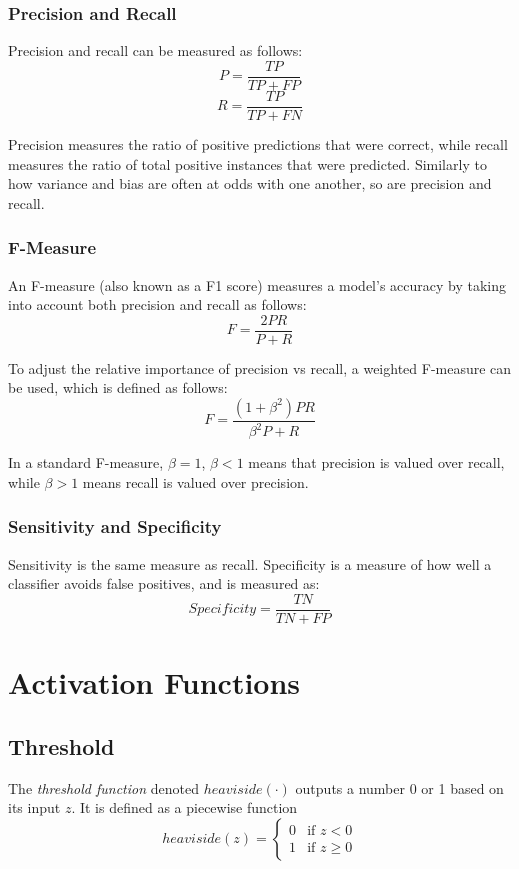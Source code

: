 \documentclass[12pt]{article}
\begin{document}
        \subsubsection{Precision and Recall}
            Precision and recall can be measured as follows:
            $$P = \frac{TP}{TP + FP}$$
            $$R = \frac{TP}{TP + FN}$$
    
            Precision measures the ratio of positive predictions that were correct, while recall measures the ratio of
            total positive instances that were predicted. Similarly to how variance and bias are often at odds with one
            another, so are precision and recall.
    
        \subsubsection{F-Measure}
            An F-measure (also known as a F1 score) measures a model's accuracy by taking into account both precision
            and recall as follows:
            $$F = \frac{2PR}{P + R}$$
    
            To adjust the relative importance of precision vs recall, a weighted F-measure can be used, which is defined
            as follows:
            $$F = \frac{(1 + \beta^2)PR}{\beta^2 P + R}$$
    
            In a standard F-measure, $\beta = 1$, $\beta < 1$ means that precision is valued over recall, while $\beta >
            1$ means recall is valued over precision.
    
        \subsubsection{Sensitivity and Specificity}
            Sensitivity is the same measure as recall. Specificity is a measure of how well a classifier avoids false
            positives, and is measured as:
            $$Specificity = \frac{TN}{TN + FP}$$

\section{Activation Functions} \label{sec:ActivationFunction}
    \subsection{Threshold} \label{sec:Threshold}
        The \textit{threshold function} denoted $heaviside(\cdot)$ outputs a number 0 or 1 based on its input $z$. It is defined as a piecewise function
        \[
            heaviside(z) = 
            \begin{cases}
                0 & \text{if $z < 0$} \\
                1 & \text{if $z \geq 0$}
            \end{cases}
        \]
\end{document}
